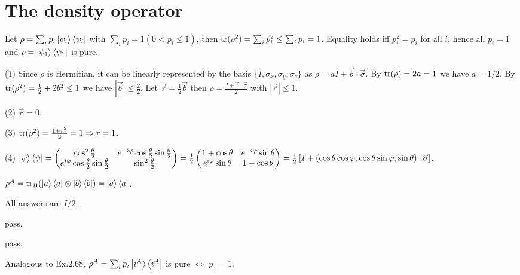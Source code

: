 \section{The density operator}

\ex Let $\rho=\sum_ip_i\left|\psi_i\right\rangle\left\langle\psi_i\right|$ with $\sum_ip_i=1(0<p_i\le1)$, then $\operatorname{tr}(\rho^2)
=\sum_ip_i^2\le\sum_ip_i=1$. Equality holds iff $p_i^2=p_i$ for all $i$, hence all $p_i=1$ and $\rho=\left|\psi_1\right\rangle\left\langle\psi_1\right|$ is pure.

\ex (1) Since $\rho$ is Hermitian, it can be linearly represented by the basis $\{I, \sigma_x, \sigma_y, \sigma_z\}$ as $\rho=aI+\vec{b}\cdot\vec{\sigma}$.
By $\operatorname{tr}(\rho)=2a=1$ we have $a=1/2$.
By $\operatorname{tr}(\rho^2)=\frac{1}{2}+2b^2\le 1$ we have $|\vec{b}|\le\frac{2}{2}$. Let $\vec{r}=\frac{1}{2}\vec{b}$ then $\rho=\frac{I+\vec{r}\cdot\vec{\sigma}}{2}$ with $|\vec{r}|\le 1$.

(2) $\vec{r}=0$.

(3) $\operatorname{tr}(\rho^2)=\frac{1+r^2}{2}=1\Rightarrow r=1$.

(4) $\left|\psi\right\rangle\left\langle\psi\right| = \begin{pmatrix}
        \cos^2\frac{\theta}{2} & e^{-i\varphi}\cos\frac{\theta}{2}\sin\frac{\theta}{2}\\
        e^{i\varphi}\cos\frac{\theta}{2}\sin\frac{\theta}{2} & \sin^2\frac{\theta}{2}
    \end{pmatrix} = \frac{1}{2}\begin{pmatrix}
        1+\cos\theta & e^{-i\varphi}\sin\theta\\
        e^{i\varphi}\sin\theta & 1-\cos\theta
    \end{pmatrix} = \frac{1}{2}\left[I+(\cos\theta\cos\varphi,\cos\theta\sin\varphi,\sin\theta)\cdot\vec\sigma\right]$.

\ex {}

\ex $\rho^A=\operatorname{tr}_B(\left|a\right\rangle\left\langle a\right|\otimes\left|b\right\rangle\left\langle b\right|)=\left|a\right\rangle\left\langle a\right|$.

\ex All answers are $I/2$.

\ex pass.

\ex pass.

\ex Analogous to Ex.2.68, $\rho^A=\sum_ip_i\left|i^A\right\rangle\left\langle i^A\right|$ is pure $\Leftrightarrow$ $p_1=1$.

